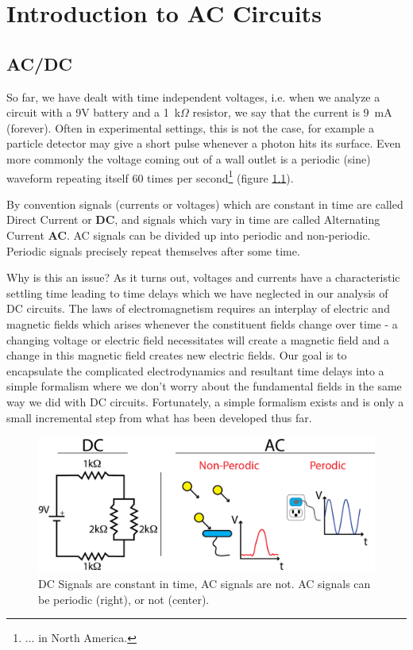 \documentclass{tufte-book}
\begin{document}
\chapter{Introduction to AC Circuits}
\section{AC/DC}

So far, we have dealt with time independent voltages, i.e. when we analyze a circuit with a 9V battery and a 1~k$\Omega$  resistor, we say that the current is 9~mA (forever). Often in experimental settings, this is not the case, for example a particle detector may give a short pulse whenever a photon hits its surface. Even more commonly the voltage coming out of a wall outlet is a periodic (sine) waveform repeating itself 60 times per second\footnote{... in North America.} (figure \ref{fig:ACexamples}).

By convention signals (currents or voltages) which are constant in time are called Direct Current or \textbf{DC}, and signals which vary in time are called Alternating Current \textbf{AC}. AC signals can be divided up into periodic and non-periodic. Periodic signals precisely repeat themselves after some time.

Why is this an issue? As it turns out, voltages and currents have a characteristic settling time leading to time delays which we have neglected in our analysis of DC circuits. The laws of electromagnetism requires an interplay of electric and magnetic fields which arises whenever the constituent fields change over time - a changing voltage or electric field necessitates will create a magnetic field and a change in this magnetic field creates new electric fields. Our goal is to encapsulate the complicated electrodynamics and resultant time delays into a simple formalism where we don't worry about the fundamental fields in the same way we did with DC circuits. Fortunately, a simple formalism exists and is only a small incremental step from what has been developed thus far.

\begin{figure}[h]
\caption{DC Signals are constant in time, AC signals are not. AC signals can be periodic (right), or not (center).}
\label{fig:ACexamples}
\begin{center}
\includegraphics[width=\textwidth]{ACexamples}
\end{center}
\end{figure}
\end{document}
